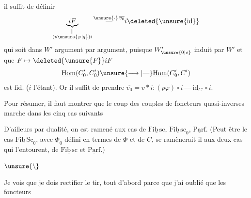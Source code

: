 
il suffit de définir
\[ \underbrace{iF}_{\substack{\Vert\\(p\unsure{\varphi|q})i}}\overset{\unsure{\cdot}\,\overline{v_0}}{\text{---}}i\deleted{\unsure{\mathrm{id}}} \]
qui soit dans $W'$ argument par argument, puisque $W'_{\unsure{0|o}}$ induit par $W'$ et que $F\mapsto\deleted{\unsure{F}}iF$
\[ \underline{\mathrm{Hom}}(C'_0,C'_0)\unsure{\longrightarrow|\text{---}}\underline{\mathrm{Hom}}(C'_0,C') \]
est  fid. ($i$ l'étant). Or il suffit de prendre $\overline{v_0}=v*i:(p\varphi)\circ i\ \text{---}\ \mathrm{id}_{C'}\circ i$.

Pour résumer, il faut montrer que le coup des couples de foncteurs quasi-inverses marche dans les cinq cas suivants 

D'ailleurs par dualité, on est ramené aux  cas de $\underline{\mathrm{Fib}\,\mathrm{sc}}$, $\underline{\mathrm{Fib}\,\mathrm{sc}}_0$, $\underline{\mathrm{Parf}}$. (Peut être le cas $\underline{\mathrm{Fib}\,\mathrm{Sc}}_0$, avec $\underline{\Phi}_0$ défini en termes de $\underline{\Phi}$ et de $C$, se ramènerait-il aux deux cas qui l'entourent, de $\underline{\mathrm{Fib}\,\mathrm{sc}}$ et $\underline{\mathrm{Parf}}$.)

\centerline{$\unsure{\backslash}$}

Je vois que je dois rectifier le tir, tout d'abord parce que j'ai oublié que les foncteurs

